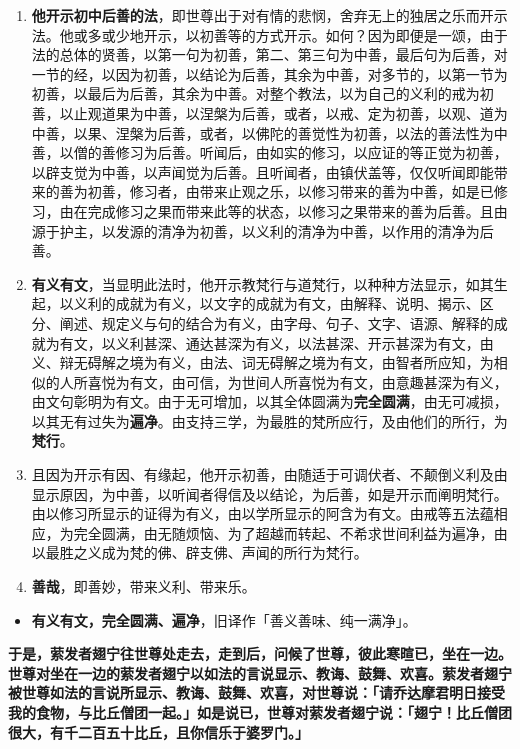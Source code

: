 \begin{enumerate}
\item \textbf{他开示初中后善的法}，即世尊出于对有情的悲悯，舍弃无上的独居之乐而开示法。他或多或少地开示，以初善等的方式开示。如何？因为即便是一颂，由于法的总体的贤善，以第一句为初善，第二、第三句为中善，最后句为后善，对一节的经，以因为初善，以结论为后善，其余为中善，对多节的，以第一节为初善，以最后为后善，其余为中善。对整个教法，以为自己的义利的戒为初善，以止观道果为中善，以涅槃为后善，或者，以戒、定为初善，以观、道为中善，以果、涅槃为后善，或者，以佛陀的善觉性为初善，以法的善法性为中善，以僧的善修习为后善。听闻后，由如实的修习，以应证的等正觉为初善，以辟支觉为中善，以声闻觉为后善。且听闻者，由镇伏盖等，仅仅听闻即能带来的善为初善，修习者，由带来止观之乐，以修习带来的善为中善，如是已修习，由在完成修习之果而带来此等的状态，以修习之果带来的善为后善。且由源于护主，以发源的清净为初善，以义利的清净为中善，以作用的清净为后善。
\item \textbf{有义有文}，当显明此法时，他开示教梵行与道梵行，以种种方法显示，如其生起，以义利的成就为有义，以文字的成就为有文，由解释、说明、揭示、区分、阐述、规定义与句的结合为有义，由字母、句子、文字、语源、解释的成就为有文，以义利甚深、通达甚深为有义，以法甚深、开示甚深为有文，由义、辩无碍解之境为有义，由法、词无碍解之境为有文，由智者所应知，为相似的人所喜悦为有文，由可信，为世间人所喜悦为有文，由意趣甚深为有义，由文句彰明为有文。由于无可增加，以其全体圆满为\textbf{完全圆满}，由无可减损，以其无有过失为\textbf{遍净}。由支持三学，为最胜的梵所应行，及由他们的所行，为\textbf{梵行}。
\item 且因为开示有因、有缘起，他开示初善，由随适于可调伏者、不颠倒义利及由显示原因，为中善，以听闻者得信及以结论，为后善，如是开示而阐明梵行。由以修习所显示的证得为有义，由以学所显示的阿含为有文。由戒等五法蕴相应，为完全圆满，由无随烦恼、为了超越而转起、不希求世间利益为遍净，由以最胜之义成为梵的佛、辟支佛、声闻的所行为梵行。
\item \textbf{善哉}，即善妙，带来义利、带来乐。\end{enumerate}

\begin{itemize}\item \textbf{有义有文，完全圆满、遍净}，旧译作「善义善味、纯一满净」。\end{itemize}

\textbf{于是，萦发者翅宁往世尊处走去，走到后，问候了世尊，彼此寒暄已，坐在一边。世尊对坐在一边的萦发者翅宁以如法的言说显示、教诲、鼓舞、欢喜。萦发者翅宁被世尊如法的言说所显示、教诲、鼓舞、欢喜，对世尊说：「请乔达摩君明日接受我的食物，与比丘僧团一起。」如是说已，世尊对萦发者翅宁说：「翅宁！比丘僧团很大，有千二百五十比丘，且你信乐于婆罗门。」}


